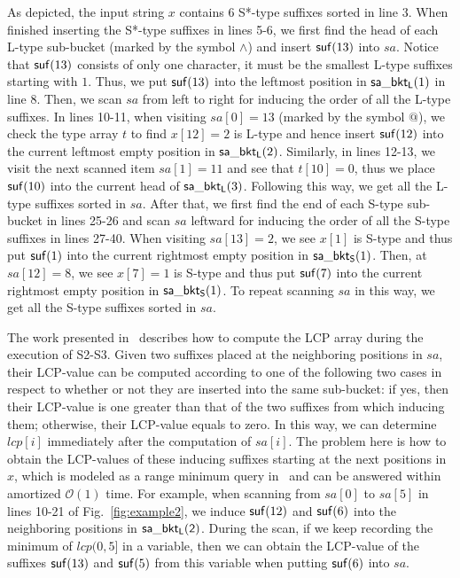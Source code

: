\documentclass[10pt,journal,compsoc]{IEEEtran}
\begin{document}
As depicted, the input string $x$ contains 6 S*-type suffixes sorted in line 3. When finished inserting the S*-type suffixes in lines 5-6, we first find the head of each L-type sub-bucket (marked by the symbol $\wedge$) and insert ${\sf suf}(13)$ into $sa$. Notice that ${\sf suf}(13)$ consists of only one character, it must be the smallest L-type suffixes starting with $1$. Thus, we put ${\sf suf}(13)$ into the leftmost position in ${\sf sa\_bkt_L}(1)$ in line 8. Then, we scan $sa$ from left to right for inducing the order of all the L-type suffixes. In lines 10-11, when visiting $sa[0] = 13$ (marked by the symbol $@$), we check the type array $t$ to find $x[12] = 2$ is L-type and hence insert ${\sf suf}(12)$ into the current leftmost empty position in ${\sf sa\_bkt_L}(2)$. Similarly, in lines 12-13, we visit the next scanned item $sa[1] = 11$ and see that $t[10] = 0$, thus we place ${\sf suf}(10)$ into the current head of ${\sf sa\_bkt_L}(3)$. Following this way, we get all the L-type suffixes sorted in $sa$. After that, we first find the end of each S-type sub-bucket in lines 25-26 and scan $sa$ leftward for inducing the order of all the S-type suffixes in lines 27-40. When visiting $sa[13] = 2$, we see $x[1]$ is S-type and thus put ${\sf suf}(1)$ into the current rightmost empty position in ${\sf sa\_bkt_S}(1)$. Then, at $sa[12] = 8$, we see $x[7] = 1$ is S-type and thus put ${\sf suf}(7)$ into the current rightmost empty position in ${\sf sa\_bkt_S}(1)$. To repeat scanning $sa$ in this way, we get all the S-type suffixes sorted in $sa$. 

The work presented in~\cite{Fischer11} describes how to compute the LCP array during the execution of S2-S3. Given two suffixes placed at the neighboring positions in $sa$, their LCP-value can be computed according to one of the following two cases in respect to whether or not they are inserted into the same sub-bucket: if yes, then their LCP-value is one greater than that of the two suffixes from which inducing them; otherwise, their LCP-value equals to zero. In this way, we can determine $lcp[i]$ immediately after the computation of $sa[i]$. The problem here is how to obtain the LCP-values of these inducing suffixes starting at the next positions in $x$, which is modeled as a range minimum query in~\cite{Fischer11} and can be answered within amortized $\mathcal{O}(1)$ time. For example, when scanning from $sa[0]$ to $sa[5]$ in lines 10-21 of Fig.~\ref{fig:example2}, we induce ${\sf suf}(12)$ and ${\sf suf}(6)$ into the neighboring positions in ${\sf sa\_bkt_L(2)}$. During the scan, if we keep recording the minimum of $lcp(0, 5]$ in a variable, then we can obtain the LCP-value of the suffixes ${\sf suf}(13)$ and ${\sf suf}(5)$ from this variable when putting ${\sf suf}(6)$ into $sa$.
\end{document}
